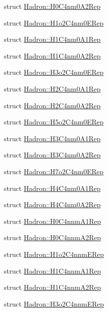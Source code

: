 \begin{DoxyCompactItemize}
\item 
struct \mbox{\hyperlink{structHadron_1_1H0C4nm0A2Rep}{Hadron\+::\+H0\+C4nm0\+A2\+Rep}}
\item 
struct \mbox{\hyperlink{structHadron_1_1H1o2C4nm0ERep}{Hadron\+::\+H1o2\+C4nm0\+E\+Rep}}
\item 
struct \mbox{\hyperlink{structHadron_1_1H1C4nm0A1Rep}{Hadron\+::\+H1\+C4nm0\+A1\+Rep}}
\item 
struct \mbox{\hyperlink{structHadron_1_1H1C4nm0A2Rep}{Hadron\+::\+H1\+C4nm0\+A2\+Rep}}
\item 
struct \mbox{\hyperlink{structHadron_1_1H3o2C4nm0ERep}{Hadron\+::\+H3o2\+C4nm0\+E\+Rep}}
\item 
struct \mbox{\hyperlink{structHadron_1_1H2C4nm0A1Rep}{Hadron\+::\+H2\+C4nm0\+A1\+Rep}}
\item 
struct \mbox{\hyperlink{structHadron_1_1H2C4nm0A2Rep}{Hadron\+::\+H2\+C4nm0\+A2\+Rep}}
\item 
struct \mbox{\hyperlink{structHadron_1_1H5o2C4nm0ERep}{Hadron\+::\+H5o2\+C4nm0\+E\+Rep}}
\item 
struct \mbox{\hyperlink{structHadron_1_1H3C4nm0A1Rep}{Hadron\+::\+H3\+C4nm0\+A1\+Rep}}
\item 
struct \mbox{\hyperlink{structHadron_1_1H3C4nm0A2Rep}{Hadron\+::\+H3\+C4nm0\+A2\+Rep}}
\item 
struct \mbox{\hyperlink{structHadron_1_1H7o2C4nm0ERep}{Hadron\+::\+H7o2\+C4nm0\+E\+Rep}}
\item 
struct \mbox{\hyperlink{structHadron_1_1H4C4nm0A1Rep}{Hadron\+::\+H4\+C4nm0\+A1\+Rep}}
\item 
struct \mbox{\hyperlink{structHadron_1_1H4C4nm0A2Rep}{Hadron\+::\+H4\+C4nm0\+A2\+Rep}}
\item 
struct \mbox{\hyperlink{structHadron_1_1H0C4nnmA1Rep}{Hadron\+::\+H0\+C4nnm\+A1\+Rep}}
\item 
struct \mbox{\hyperlink{structHadron_1_1H0C4nnmA2Rep}{Hadron\+::\+H0\+C4nnm\+A2\+Rep}}
\item 
struct \mbox{\hyperlink{structHadron_1_1H1o2C4nnmERep}{Hadron\+::\+H1o2\+C4nnm\+E\+Rep}}
\item 
struct \mbox{\hyperlink{structHadron_1_1H1C4nnmA1Rep}{Hadron\+::\+H1\+C4nnm\+A1\+Rep}}
\item 
struct \mbox{\hyperlink{structHadron_1_1H1C4nnmA2Rep}{Hadron\+::\+H1\+C4nnm\+A2\+Rep}}
\item 
struct \mbox{\hyperlink{structHadron_1_1H3o2C4nnmERep}{Hadron\+::\+H3o2\+C4nnm\+E\+Rep}}
\item 

\end{DoxyCompactItemize}
